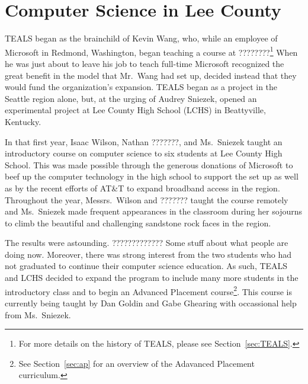 \newcommand{\nathanln}{???????}

\section{Computer Science in Lee County}\label{sec:CSInLee}

TEALS began as the brainchild of Kevin Wang, who, while an employee of Microsoft
in Redmond, Washington, began teaching a course at ????????\footnote{For more
details on the history of TEALS, please see Section~\ref{sec:TEALS}.} When he
was just about to leave his job to teach full-time Microsoft recognized the
great benefit in the model that Mr.~Wang had set up, decided instead that they
would fund the organization's expansion. TEALS began as a project in the Seattle
region alone, but, at the urging of Audrey Sniezek, opened an experimental
project at Lee County High School (LCHS) in Beattyville, Kentucky.

In that first year, Isaac Wilson, Nathan \nathanln{}, and Ms.~Sniezek taught an
introductory course on computer science to six students at Lee County High
School. This was made possible through the generous donations of Microsoft
to beef up the computer technology in the high school to support the
set up as well as by the recent efforts of AT\&T to expand broadband
access in the region\cite{Something in which Hal Rogers is talking about Silicon
Holler}. Throughout the year, Messrs.~Wilson and \nathanln{} taught the course
remotely and Ms.~Sniezek made frequent appearances in the classroom during her
sojourns to climb the beautiful and challenging sandstone rock faces in the
region.

The results were astounding. ????????????? Some stuff about what people are
doing now. Moreover, there was strong interest from the two students who had
not graduated to continue their computer science education. As such, TEALS and
LCHS decided to expand the program to include many more students in the
introductory class and to begin an Advanced Placement course\footnote{See
Section~\ref{sec:ap} for an overview of the Adavanced Placement curriculum.}.
This course is currently being taught by Dan Goldin and Gabe Ghearing with
occassional help from Ms.~Sniezek.

